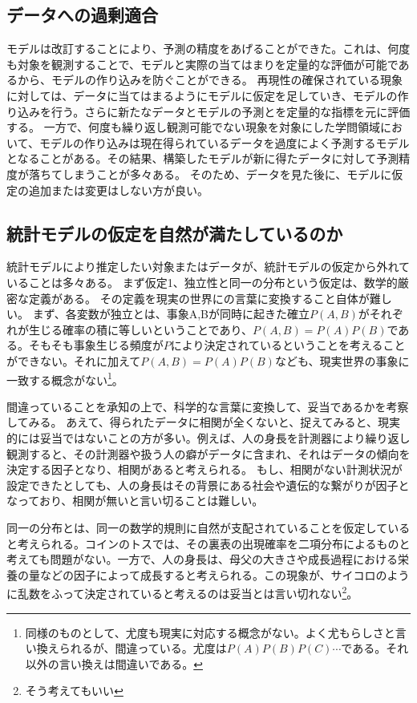 \subsection{データへの過剰適合}
モデルは改訂することにより、予測の精度をあげることができた。これは、何度も対象を観測することで、モデルと実際の当てはまりを定量的な評価が可能であるから、モデルの作り込みを防ぐことができる。
再現性の確保されている現象に対しては、データに当てはまるようにモデルに仮定を足していき、モデルの作り込みを行う。さらに新たなデータとモデルの予測とを定量的な指標を元に評価する。
一方で、何度も繰り返し観測可能でない現象を対象にした学問領域において、モデルの作り込みは現在得られているデータを過度によく予測するモデルとなることがある。その結果、構築したモデルが新に得たデータに対して予測精度が落ちてしまうことが多々ある。
そのため、データを見た後に、モデルに仮定の追加または変更はしない方が良い。




\subsection{統計モデルの仮定を自然が満たしているのか}
統計モデルにより推定したい対象またはデータが、統計モデルの仮定から外れていることは多々ある。
まず仮定1、独立性と同一の分布という仮定は、数学的厳密な定義がある。
その定義を現実の世界にの言葉に変換すること自体が難しい。
まず、各変数が独立とは、事象A,Bが同時に起きた確立$P(A,B)$がそれぞれが生じる確率の積に等しいということであり、$P(A,B)=P(A)P(B)$である。そもそも事象生じる頻度が$P$により決定されているということを考えることができない。それに加えて$P(A,B)=P(A)P(B)$なども、現実世界の事象に一致する概念がない\footnote{同様のものとして、尤度も現実に対応する概念がない。よく尤もらしさと言い換えられるが、間違っている。尤度は$P(A)P(B)P(C)\cdots$である。それ以外の言い換えは間違いである。}。

間違っていることを承知の上で、科学的な言葉に変換して、妥当であるかを考察してみる。
あえて、得られたデータに相関が全くないと、捉えてみると、現実的には妥当ではないことの方が多い。例えば、人の身長を計測器により繰り返し観測すると、その計測器や扱う人の癖がデータに含まれ、それはデータの傾向を決定する因子となり、相関があると考えられる。
もし、相関がない計測状況が設定できたとしても、人の身長はその背景にある社会や遺伝的な繋がりが因子となっており、相関が無いと言い切ることは難しい。

同一の分布とは、同一の数学的規則に自然が支配されていることを仮定していると考えられる。コインのトスでは、その裏表の出現確率を二項分布によるものと考えても問題がない。一方で、人の身長は、母父の大きさや成長過程における栄養の量などの因子によって成長すると考えられる。この現象が、サイコロのように乱数をふって決定されていると考えるのは妥当とは言い切れない\footnote{そう考えてもいい}。


